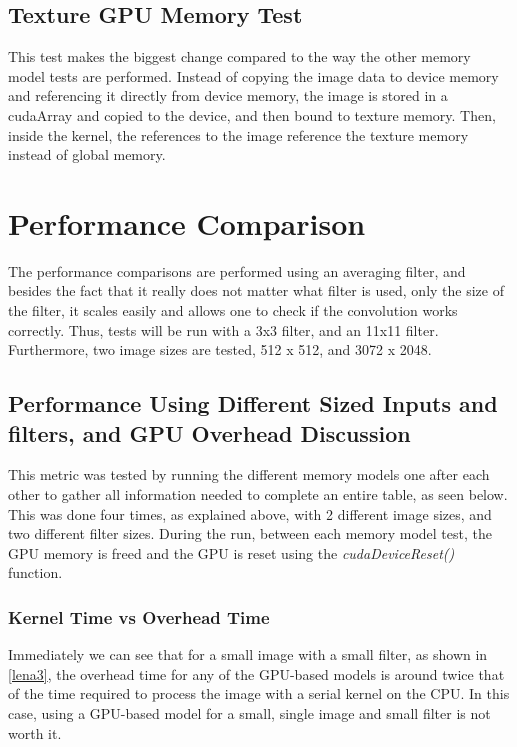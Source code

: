 \documentclass[a4paper,twoside,11pt]{report}
\begin{document}
\section{Texture GPU Memory Test}
This test makes the biggest change compared to the way the other memory model tests are performed. Instead of copying the image data to device memory and referencing it directly from device memory, the image is stored in a cudaArray and copied to the device, and then bound to texture memory. Then, inside the kernel, the references to the image reference the texture memory instead of global memory.

\chapter*{Performance Comparison}
\setcounter{chapter}{3}
\setcounter{section}{0}

The performance comparisons are performed using an averaging filter, and besides the fact that it really does not matter what filter is used, only the size of the filter, it scales easily and allows one to check if the convolution works correctly. Thus, tests will be run with a 3x3 filter, and an 11x11 filter. Furthermore, two image sizes are tested, 512 x 512, and 3072 x 2048.

\section{Performance Using Different Sized Inputs and filters, and GPU Overhead Discussion}
This metric was tested by running the different memory models one after each other to gather all information needed to complete an entire table, as seen below. This was done four times, as explained above, with 2 different image sizes, and two different filter sizes. During the run, between each memory model test, the GPU memory is freed and the GPU is reset using the \textit{cudaDeviceReset()} function.

\subsection{Kernel Time vs Overhead Time}
Immediately we can see that for a small image with a small filter, as shown in \cref{lena3}, the overhead time for any of the GPU-based models is around twice that of the time required to process the image with a serial kernel on the CPU. In this case, using a GPU-based model for a small, single image and small filter is not worth it. 
\end{document}
